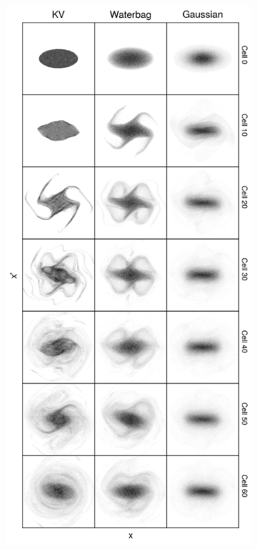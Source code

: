 \begin{figure}[!p]
\begin{subfigure}[b]{0.47\textwidth}
        \label{fig:coherent_instabilities_a}
    \end{subfigure}
    \hfill
    \begin{subfigure}[b]{0.47\textwidth}
        \includegraphics[width=\textwidth]{Images/chapter1/coherent_instability_third_order.png}

\end{subfigure}
\end{figure}
